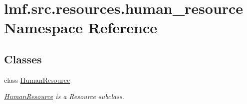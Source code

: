 \hypertarget{namespacelmf_1_1src_1_1resources_1_1human__resource}{\section{lmf.\+src.\+resources.\+human\+\_\+resource Namespace Reference}
\label{namespacelmf_1_1src_1_1resources_1_1human__resource}
}
\subsection*{Classes}
\begin{DoxyCompactItemize}
\item 
class \hyperlink{classlmf_1_1src_1_1resources_1_1human__resource_1_1_human_resource}{Human\+Resource}
\begin{DoxyCompactList}\small\item\em \hyperlink{classlmf_1_1src_1_1resources_1_1human__resource_1_1_human_resource}{Human\+Resource} is a Resource subclass. \end{DoxyCompactList}\end{DoxyCompactItemize}
